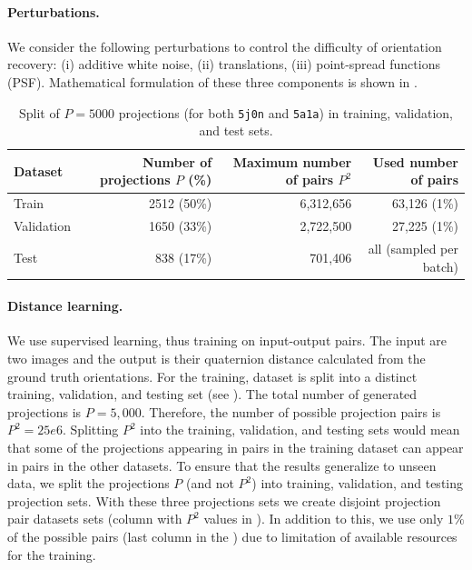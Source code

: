 \paragraph{Perturbations.}
We consider the following perturbations to control the difficulty of orientation recovery: (i) additive white noise, (ii) translations, (iii) point-spread functions (PSF). Mathematical formulation of these three components is shown in .

\begin{table}[ht!]
    \centering
    \begin{tabular}{lrrr}
        \toprule
        Dataset & Number of projections $P$ (\%) & Maximum number of pairs $P^2$ & Used number of pairs \\
        \midrule
        Train & 2512 (50\%) & 6,312,656 & 63,126 (1\%) \\
        Validation & 1650 (33\%) & 2,722,500 & 27,225 (1\%) \\
        Test & 838 (17\%) & 701,406 & all (sampled per batch) \\
        \bottomrule
    \end{tabular}
    \caption{
        Split of $P=5000$ projections (for both \texttt{5j0n} and \texttt{5a1a}) in training, validation, and test sets.
    }\label{tab:dataset}
\end{table}

\paragraph{Distance learning.}
We use supervised learning, thus training on input-output pairs.
The input are two images and the output is their quaternion distance calculated from the ground truth orientations.
For the training, dataset is split into a distinct training, validation, and testing set (see ).
The total number of generated projections is $P = 5,000$.
Therefore, the number of possible projection pairs is $P^2 = 25e6$.
Splitting $P^2$ into the training, validation, and testing sets would mean that some of the projections appearing in pairs in the training dataset can appear in pairs in the other datasets.
To ensure that the results generalize to unseen data, we split the projections $P$ (and not $P^2$) into training, validation, and testing projection sets.
With these three projections sets we create disjoint projection pair datasets sets (column with $P^2$ values in ).
In addition to this, we use only $1\%$ of the possible pairs (last column in the ) due to limitation of available resources for the training.


